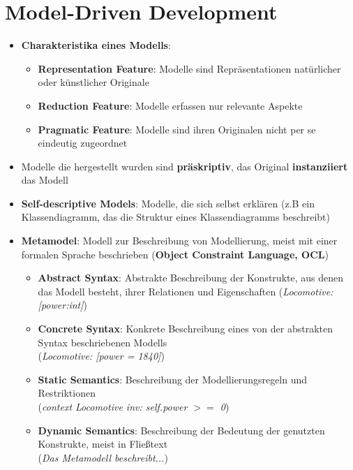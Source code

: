 \section{Model-Driven Development}
\label{mdd:sec:model_driven_development}

\begin{itemize}
	\item \textbf{Charakteristika eines Modells}:
	\begin{itemize}
		\item \textbf{Representation Feature}: Modelle sind Repräsentationen natürlicher oder künstlicher Originale
		\item \textbf{Reduction Feature}: Modelle erfassen nur relevante Aspekte
		\item \textbf{Pragmatic Feature}: Modelle sind ihren Originalen nicht per se eindeutig zugeordnet
	\end{itemize}
	\item Modelle die  hergestellt wurden sind \textbf{präskriptiv}, das Original \textbf{instanziiert} das Modell
	\item \textbf{Self-descriptive Models}: Modelle, die sich selbst erklären (z.B ein Klassendiagramm, das die Struktur eines Klassendiagramms beschreibt)
	\item \textbf{Metamodel}: Modell zur Beschreibung von Modellierung, meist mit einer formalen Sprache beschrieben (\textbf{Object Constraint Language, OCL})
	\begin{itemize}
		\item \textbf{Abstract Syntax}: Abstrakte Beschreibung der Konstrukte, aus denen das Modell besteht, ihrer Relationen und Eigenschaften (\textit{Locomotive: [power:int]})
		\item \textbf{Concrete Syntax}: Konkrete Beschreibung eines von der abstrakten Syntax beschriebenen Modells\\(\textit{Locomotive: [power = 1840]})
		\item \textbf{Static Semantics}: Beschreibung der Modellierungsregeln und Restriktionen\\(\textit{context Locomotive inv: self.power $>=$ 0})
		\item \textbf{Dynamic Semantics}: Beschreibung der Bedeutung der genutzten Konstrukte, meist in Fließtext\\(\textit{Das Metamodell beschreibt...})
	\end{itemize}
\end{itemize}

